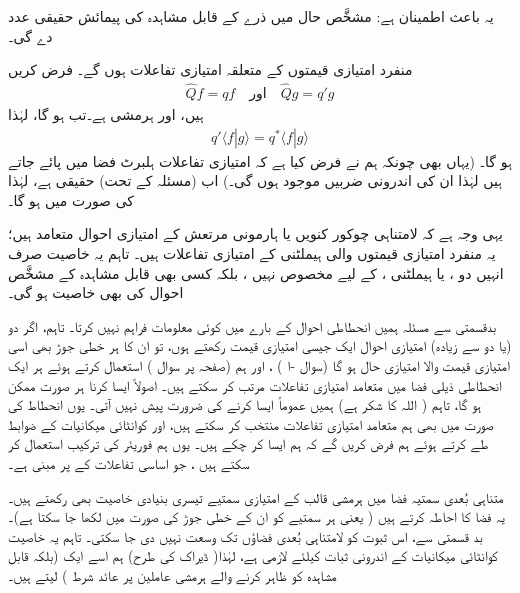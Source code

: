  یہ باعث اطمینان ہے: مشخَّص حال میں  ذرے کے قابل مشاہدہ کی پیمائش  حقیقی عدد دے گی۔ 
 
منفرد امتیازی  قیمتوں  کے متعلقہ امتیازی تفاعلات  ہوں گے۔ 
 فرض کریں
\begin{align*}
\hat{Q}f = qf \quad \text{اور}\quad \hat{Q}g=q'g
\end{align*}
ہیں، اور  ہرمشی ہے۔تب  ہو گا، لہٰذا
\begin{align*}
q' \langle f | g \rangle = q^{*} \langle f | g \rangle
\end{align*}
 ہو گا۔ (یہاں بھی چونکہ ہم نے فرض کیا ہے کہ امتیازی تفاعلات ہلبرٹ فضا میں پائے جاتے ہیں لہٰذا ان کی اندرونی ضربیں موجود ہوں گی۔) اب (مسئلہ  کے تحت)  حقیقی ہے، لہٰذا  کی صورت میں  ہو گا۔ 

یہی وجہ ہے کہ لامتناہی چوکور کنویں یا    ہارمونی مرتعش کے امتیازی احوال متعامد ہیں؛ یہ منفرد امتیازی قیمتوں  والی  ہیملٹنی کے امتیازی تفاعلات ہیں۔ تاہم یہ خاصیت صرف انہیں دو  ، یا ہیملٹنی ، کے لیے مخصوص نہیں ، بلکہ کسی بھی قابل مشاہدہ کے مشخَّص احوال کی بھی خاصیت  ہو گی۔

 بدقسمتی سے مسئلہ  ہمیں انحطاطی احوال  کے بارے میں کوئی معلومات فراہم نہیں کرتا۔ تاہم، اگر دو (یا دو سے زیادہ) امتیازی احوال ایک جیسی امتیازی قیمت رکھتے ہوں، تو ان کا ہر خطی جوڑ بھی اسی امتیازی قیمت والا امتیازی حال ہو گا (سوال -ا ) ، اور ہم  (صفحہ  پر سوال )  استعمال کرتے ہوئے ہر ایک انحطاطی ذیلی فضا میں متعامد امتیازی تفاعلات مرتب کر سکتے ہیں۔ اصولاً ایسا کرنا ہر صورت ممکن ہو گا، تاہم ( اللہ کا شکر ہے) ہمیں عموماً ایسا کرنے کی ضرورت پیش نہیں آتی۔ یوں انحطاط کی صورت میں بھی ہم متعامد امتیازی تفاعلات منتخب کر سکتے ہیں، اور کوانٹائی میکانیات کے ضوابط طے کرتے ہوئے ہم فرض کریں گے کہ ہم ایسا کر چکے ہیں۔ یوں ہم فوریئر کی ترکیب استعمال کر سکتے ہیں ، جو اساسی تفاعلات کے پر مبنی ہے۔

 متناہی بُعدی سمتیہ فضا میں ہرمشی قالب کے امتیازی سمتیے تیسری بنیادی خاصیت بھی رکھتے ہیں۔ یہ فضا کا احاطہ کرتے ہیں ( یعنی ہر سمتیے کو ان کے خطی جوڑ کی صورت میں لکھا جا سکتا ہے)۔ بد قسمتی سے، اس ثبوت کو  لامتناہی بُعدی فضاؤں تک وسعت نہیں دی جا سکتی۔ تاہم یہ خاصیت کوانٹائی میکانیات کے اندرونی ثبات کیلئے لازمی ہے، لہٰذا( ڈیراک کی طرح) ہم اسے ایک  (بلکہ قابل مشاہدہ کو ظاہر کرنے والے ہرمشی عاملین پر عائد شرط )  لیتے ہیں۔
 
